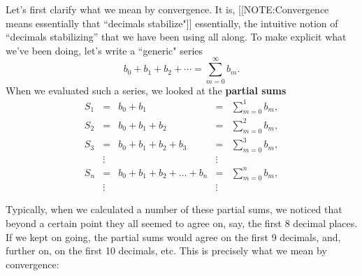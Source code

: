 Let's first clarify what we mean by convergence.
It is,
[[NOTE:Convergence means  essentially that  ``decimals stabilize"]]
essentially, the intuitive notion of ``decimals stabilizing'' that we
have been using all along.  To make explicit what we've been doing,
let's write a ``generic" series
\[
b_0 + b_1 + b_2 + \cdots = \sum_{m=0}^\infty b_m .
\]
When we evaluated such a series, we looked at the {\bf partial
  sums}
\addtolength{\arraycolsep}{-3pt}
\[
\begin{array}{lclcl}
S_1&=&b_0 + b_1 &=&{\displaystyle \sum_{m=0}^1 b_m}, \\[.18in]
S_2&=&b_0 + b_1+b_2 &=&{\displaystyle\sum_{m=0}^2 b_m}, \\[.18in]
S_3&=&b_0 + b_1 + b_2 +b_3&=&{\displaystyle\sum_{m=0}^3 b_m}, \\[-5pt]
&\vdots & &\vdots &  \\[-5pt]
S_n&=&b_0 + b_1 + b_2 + \ldots+b_n&=&{\displaystyle\sum_{m=0}^n b_m}, \\[-5pt]
&\vdots&&\vdots & 
\end{array}
\]
\addtolength{\arraycolsep}{3pt}



\enlargethispage*{20pt}
Typically, when we calculated a number of these partial sums, we
noticed that beyond a certain point they all seemed to agree on, say,
the first 8 decimal places.  If we kept on going, the partial sums
would agree on the first 9 decimals, and, further on, on the first 10
decimals, etc. This is precisely what we mean by
convergence:




\begin{center}
\end{center}



